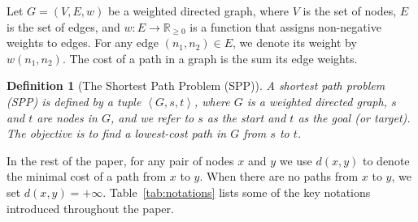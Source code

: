 \documentclass[twoside,11pt]{article}
\newtheorem{definition}[theorem]{Definition}
\newcommand{\tuple}[1]{\ensuremath{\left \langle #1 \right \rangle }}
\newcommand{\nonnegreals}{\mathbb{R}_{\geq 0}}
\begin{document}
Let $G = (V, E, w)$ be a weighted directed graph, where $V$ is the set of nodes, $E$ is the set of edges, and $w:E\rightarrow \nonnegreals$ is a function that assigns non-negative weights to edges. 
For any edge $(n_1,n_2)\in E$, we denote its weight by $w(n_1, n_2)$. The cost of a path in a graph is the sum its edge weights. %



\begin{definition}[The Shortest Path Problem (SPP)]
  \label{def:spp}
  A shortest path problem (SPP) is defined by a tuple $\tuple{G, s, t}$, where $G$ is a weighted directed graph, $s$ and $t$ are nodes in $G$, and we refer to $s$ as the \emph{start} and $t$ as the \emph{goal} (or target). 
  The objective is to find a lowest-cost path in $G$ from $s$ to $t$. %
\end{definition}

In the rest of the paper, for any pair of nodes $x$ and $y$ we use $d(x, y)$ to denote the minimal cost of a path from $x$ to $y$.
When there are no paths from $x$ to $y$, we set $d(x, y) = +\infty$.
Table~\ref{tab:notations} lists some of the key notations introduced throughout the paper.
\end{document}

